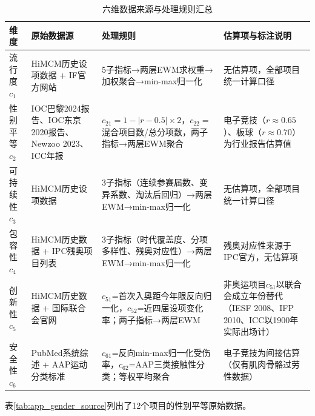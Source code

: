 \documentclass[twoside]{CUGThesis}
\begin{document}
\begin{table}[htbp]
\centering
\small
\caption{六维数据来源与处理规则汇总}
\label{tab:app_dimension_sources}
\begin{tabularx}{\textwidth}{l>{\raggedright\arraybackslash}p{4cm}>{\raggedright\arraybackslash}X>{\raggedright\arraybackslash}p{2.8cm}}
\toprule
维度 & 原始数据源 & 处理规则 & 估算项与标注说明 \\
\midrule
流行度 $c_1$ & HiMCM历史设项数据 + IF官方网站 &
5子指标→两层EWM求权重→加权聚合→min-max归一化 & 无估算项，全部项目统一计算口径 \\
\addlinespace
性别平等 $c_2$ & IOC巴黎2024报告、IOC东京2020报告、Newzoo 2023、ICC年报 &
$c_{21}=1-|r-0.5|\times2$，$c_{22}=$混合项目数/总分项数，两子指标→两层EWM聚合 &
电子竞技（$r\approx0.65$）、板球（$r\approx0.70$）为行业报告估算值 \\
\addlinespace
可持续性 $c_3$ & HiMCM历史设项数据 &
3子指标（连续参赛届数、变异系数、淘汰后回归）→两层EWM→min-max归一化 & 无估算项，全部项目统一计算口径 \\
\addlinespace
包容性 $c_4$ & HiMCM历史数据 + IPC残奥项目列表 &
3子指标（时代覆盖度、分项多样性、残奥对应性）→两层EWM→min-max归一化 & 残奥对应性来源于IPC官方，无估算项 \\
\addlinespace
创新性 $c_5$ & HiMCM历史数据 + 国际联合会官网 &
$c_{51}$=首次入奥距今年限反向归一化，$c_{52}$=近四届设项变化率；两子指标→两层EWM &
非奥运项目$c_{51}$以联合会成立年份替代（IESF 2008、IFP 2010、ICC以1900年实际出场计） \\
\addlinespace
安全性 $c_6$ & PubMed系统综述 + AAP运动分类标准 &
$c_{61}$=反向min-max归一化受伤率，$c_{62}$=AAP三类接触性分类；等权平均聚合 &
电子竞技为间接估算（仅有肌肉骨骼过劳性数据\cite{Tholl2022}） \\
\bottomrule
\end{tabularx}
\end{table}

表\ref{tab:app_gender_source}列出了12个项目的性别平等原始数据。
\end{document}
